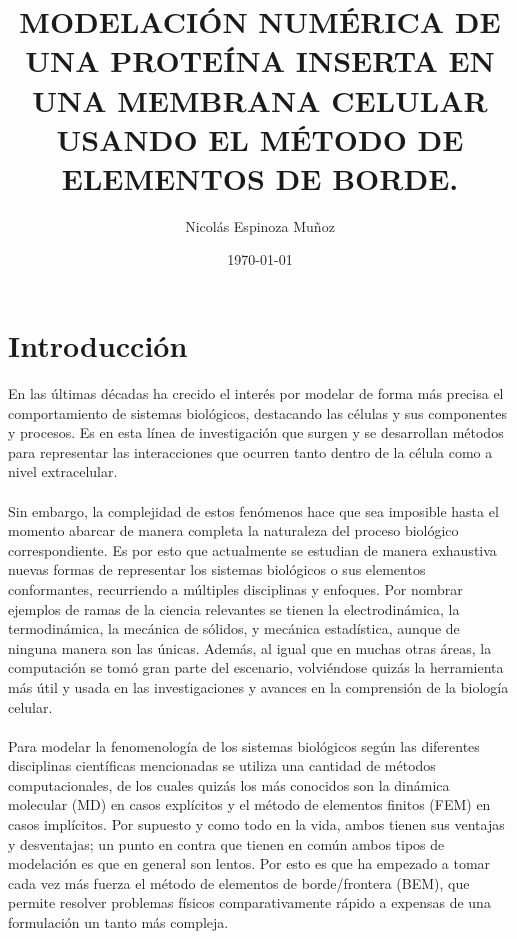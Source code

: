 \documentclass[12pt, oneside, numbers, spanish]{ezthesis}
\date{\today}
\author{Nicolás Espinoza Muñoz}
\title{MODELACIÓN NUMÉRICA DE UNA PROTEÍNA INSERTA EN UNA MEMBRANA CELULAR USANDO EL MÉTODO DE ELEMENTOS DE BORDE.}
\numberwithin{equation}{section}
\begin{document}


\newpage
\tableofcontents
\newpage

\chapter{Introducción}\label{Chap:Intro}
En las últimas décadas ha crecido el interés por modelar de forma más precisa el comportamiento de sistemas biológicos, destacando las células y sus componentes y procesos. Es en esta línea de investigación que surgen y se desarrollan métodos para representar las interacciones que ocurren tanto dentro de la célula como a nivel extracelular.\\\\
Sin embargo, la complejidad de estos fenómenos hace que sea imposible hasta el momento abarcar de manera completa la naturaleza del proceso biológico correspondiente. Es por esto que actualmente se estudian de manera exhaustiva nuevas formas de representar los sistemas biológicos o sus elementos conformantes, recurriendo a múltiples disciplinas y enfoques. Por nombrar ejemplos de ramas de la ciencia relevantes se tienen la electrodinámica, la termodinámica, la mecánica de sólidos, y mecánica estadística, aunque de ninguna manera son las únicas. Además, al igual que en muchas otras áreas, la computación se tomó gran parte del escenario, volviéndose quizás la herramienta más útil y usada en las investigaciones y avances en la comprensión de la biología celular.\\\\
Para modelar la fenomenología de los sistemas biológicos según las diferentes disciplinas científicas mencionadas se utiliza una cantidad de métodos computacionales, de los cuales quizás los más conocidos son la dinámica molecular (MD) en casos explícitos y el método de elementos finitos (FEM) en casos implícitos. Por supuesto y como todo en la vida, ambos tienen sus ventajas y desventajas; un punto en contra que tienen en común ambos tipos de modelación es que en general son lentos. Por esto es que ha empezado a tomar cada vez más fuerza el método de elementos de borde/frontera (BEM), que permite resolver problemas físicos comparativamente rápido a expensas de una formulación un tanto más compleja.\\\\
\end{document}
